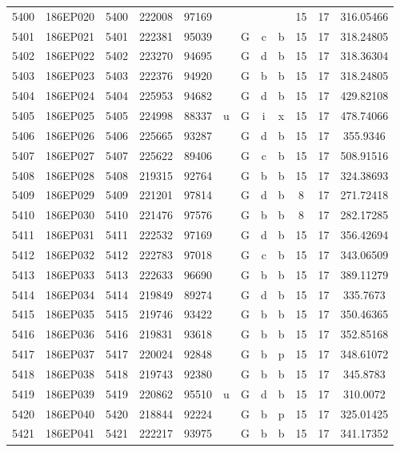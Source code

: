 \begin{tabular}{|*{12}{c|}}
5400 & 186EP020 & 5400 & 222008 & 97169 &  &  &  &  & 15 & 17 & 316.05466 \\ 
5401 & 186EP021 & 5401 & 222381 & 95039 &  & G & c & b & 15 & 17 & 318.24805 \\ 
5402 & 186EP022 & 5402 & 223270 & 94695 &  & G & d & b & 15 & 17 & 318.36304 \\ 
5403 & 186EP023 & 5403 & 222376 & 94920 &  & G & b & b & 15 & 17 & 318.24805 \\ 
5404 & 186EP024 & 5404 & 225953 & 94682 &  & G & d & b & 15 & 17 & 429.82108 \\ 
5405 & 186EP025 & 5405 & 224998 & 88337 & u & G & i & x & 15 & 17 & 478.74066 \\ 
5406 & 186EP026 & 5406 & 225665 & 93287 &  & G & d & b & 15 & 17 & 355.9346 \\ 
5407 & 186EP027 & 5407 & 225622 & 89406 &  & G & c & b & 15 & 17 & 508.91516 \\ 
5408 & 186EP028 & 5408 & 219315 & 92764 &  & G & b & b & 15 & 17 & 324.38693 \\ 
5409 & 186EP029 & 5409 & 221201 & 97814 &  & G & d & b & 8 & 17 & 271.72418 \\ 
5410 & 186EP030 & 5410 & 221476 & 97576 &  & G & b & b & 8 & 17 & 282.17285 \\ 
5411 & 186EP031 & 5411 & 222532 & 97169 &  & G & d & b & 15 & 17 & 356.42694 \\ 
5412 & 186EP032 & 5412 & 222783 & 97018 &  & G & c & b & 15 & 17 & 343.06509 \\ 
5413 & 186EP033 & 5413 & 222633 & 96690 &  & G & b & b & 15 & 17 & 389.11279 \\ 
5414 & 186EP034 & 5414 & 219849 & 89274 &  & G & d & b & 15 & 17 & 335.7673 \\ 
5415 & 186EP035 & 5415 & 219746 & 93422 &  & G & b & b & 15 & 17 & 350.46365 \\ 
5416 & 186EP036 & 5416 & 219831 & 93618 &  & G & b & b & 15 & 17 & 352.85168 \\ 
5417 & 186EP037 & 5417 & 220024 & 92848 &  & G & b & p & 15 & 17 & 348.61072 \\ 
5418 & 186EP038 & 5418 & 219743 & 92380 &  & G & b & b & 15 & 17 & 345.8783 \\ 
5419 & 186EP039 & 5419 & 220862 & 95510 & u & G & d & b & 15 & 17 & 310.0072 \\ 
5420 & 186EP040 & 5420 & 218844 & 92224 &  & G & b & p & 15 & 17 & 325.01425 \\ 
5421 & 186EP041 & 5421 & 222217 & 93975 &  & G & b & b & 15 & 17 & 341.17352 \\ 

\end{tabular}
